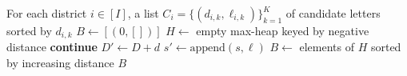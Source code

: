 \begin{algorithm}[!htbp]
\caption{Beam search for nearest words with width $L$}
\label{alg:beam_search}
\begin{algorithmic}[1]
\Require For each district $i\in[I]$, a list $C_i=\{(d_{i,k}, \ell_{i,k})\}_{k=1}^K$ of candidate letters sorted by $d_{i,k}$
\State $B \gets [(0, [])]$ 
    \State $H \gets$ empty max-heap keyed by negative distance 
                \State \textbf{continue} 
            \EndIf
            \State $D' \gets D + d$
            \State $s' \gets \mathrm{append}(s,\ell)$
            \State {}
                \State {} 
            \EndIf
        \EndFor
    \EndFor
    \State $B \gets$ elements of $H$ sorted by increasing distance
\EndFor
\State \Return $B$
\end{algorithmic}
\end{algorithm}

